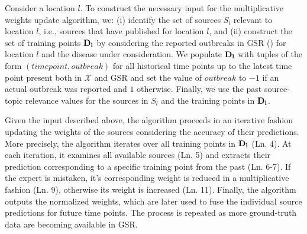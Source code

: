 \documentclass[twoside,leqno,twocolumn]{article}
\begin{document}
Consider a location $l$. To construct the necessary input for the multiplicative weights update algorithm, we: (i) identify the set of sources $S_l$ relevant to location $l$, i.e., sources that have published for location $l$, and (ii) construct the set of training points  ${\bf D_l}$ by considering the reported outbreaks in GSR () for location $l$ and the disease under consideration. We populate ${\bf D_l}$ with tuples of the form $(time point, outbreak)$ for all historical time points up to the latest time point present both in $\mathcal{X}$ and GSR and set the value of $outbreak$ to $-1$ if an actual outbreak was reported and $1$ otherwise. Finally, we use the past source-topic relevance values for the sources in $S_l$ and the training points in ${\bf D_l}$.

Given the input described above, the algorithm proceeds in an iterative fashion updating the weights of the sources considering the accuracy of their predictions. More precisely, the algorithm iterates over all training points in ${\bf D_l}$ (Ln. 4).  At each iteration, it examines all available sources (Ln. 5) and extracts their prediction corresponding to a specific training point from the past (Ln. 6-7). If the expert is mistaken, it's corresponding weight is reduced in a multiplicative fashion (Ln. 9), otherwise its weight is increased (Ln. 11). Finally, the algorithm outputs the normalized weights, which are later used to fuse the individual source predictions for future time points. The process is repeated as more ground-truth data are becoming available in GSR.
\end{document}
